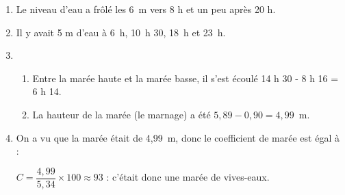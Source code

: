 \documentclass[10pt]{article}
\begin{document}
\begin{enumerate}
\item Le niveau d'eau a frôlé les 6~m  vers 8 h et un peu après 20 h.
\item Il y avait 5 m d'eau à 6~h, 10~h 30, 18~h et 23~h.
\item
	\begin{enumerate}
		\item Entre la marée haute et la marée basse, il s'est écoulé 14 h 30 - 8 h 16 = 6 h 14.
		\item La hauteur de la marée (le marnage) a été $5,89 - 0,90 = 4,99$~m.
	\end{enumerate}

\item On a vu que la marée était de 4,99~m, donc le coefficient de marée est égal à :

$C = \dfrac{4,99}{5,34}\times 100 \approx 93$ : c'était donc une marée de vives-eaux.
\end{enumerate}
\end{document}
